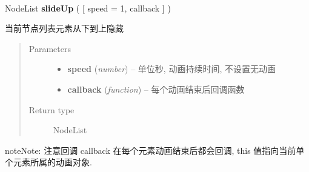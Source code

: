 \documentclass[letterpaper,10pt,english]{sphinxmanual}
\begin{document}
\begin{fulllineitems}
\label{api/core/node/slideUp:Node.slideUp}~
\begin{DUlineblock}{0em}
\item[] NodeList \textbf{slideUp} ( {[} speed = 1, callback {]} )
\item[] 当前节点列表元素从下到上隐藏
\end{DUlineblock}
\begin{quote}\begin{description}
\item[{Parameters}] \leavevmode\begin{itemize}
\item {}
\textbf{speed} (\emph{number}) -- 单位秒, 动画持续时间, 不设置无动画

\item {}
\textbf{callback} (\emph{function}) -- 每个动画结束后回调函数

\end{itemize}

\item[{Return type}] \leavevmode
NodeList

\end{description}\end{quote}

\begin{notice}{note}{Note:}
注意回调 callback 在每个元素动画结束后都会回调,  this 值指向当前单个元素所属的动画对象.
\end{notice}

\end{fulllineitems}
\end{document}

